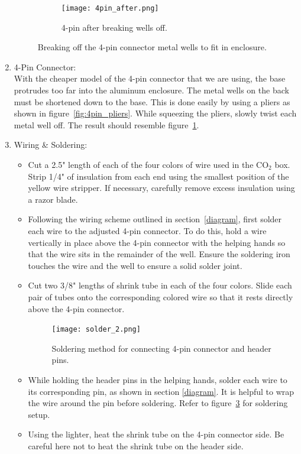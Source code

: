 \documentclass[letterpaper,12pt]{article}
\begin{document}
\begin{enumerate}
\begin{figure}
\begin{subfigure}{.45\textwidth}
				\centering
				\texttt{[image: 4pin\_after.png]}
				\caption{4-pin after breaking wells off.}
				\label{fig:4pin_after}
			\end{subfigure}
			\caption{Breaking off the 4-pin connector metal wells to fit in enclosure.}
			\label{fig:4pin}
		\end{figure}
		\item 4-Pin Connector: \\
		\textnormal{With the cheaper model of the 4-pin connector that we are using, the base protrudes too far into the aluminum enclosure. The metal wells on the back must be shortened down to the base. This is done easily by using a pliers as shown in figure~\ref{fig:4pin_pliers}. While squeezing the pliers, slowly twist each metal well off. The result should resemble figure~\ref{fig:4pin_after}.}
		\item Wiring \& Soldering:
		\begin{itemize}
			\item Cut a 2.5" length of each of the four colors of wire used in the CO$_2$ box. Strip 1/4" of insulation from each end using the smallest position of the yellow wire stripper. If necessary, carefully remove excess insulation using a razor blade.
			\item  Following the wiring scheme outlined in section~\ref{diagram}, first solder each wire to the adjusted 4-pin connector. To do this, hold a wire vertically in place above the 4-pin connector with the helping hands so that the wire sits in the remainder of the well. Ensure the soldering iron touches the wire and the well to ensure a solid solder joint.
			\item Cut two 3/8" lengths of shrink tube in each of the four colors. Slide each pair of tubes onto the corresponding colored wire so that it rests directly above the 4-pin connector.
			\begin{figure} [h]
				\centering
				\texttt{[image: solder\_2.png]}
				\caption{Soldering method for connecting 4-pin connector and header pins.}
				\label{fig:solder}
			\end{figure}
			\item While holding the header pins in the helping hands, solder each wire to its corresponding pin, as shown in section \ref{diagram}. It is helpful to wrap the wire around the pin before soldering. Refer to figure~\ref{fig:solder} for soldering setup.
			\item Using the lighter, heat the shrink tube on the 4-pin connector side. Be careful here not to heat the shrink tube on the header side.
		\end{itemize}
	\end{enumerate}
\end{document}
